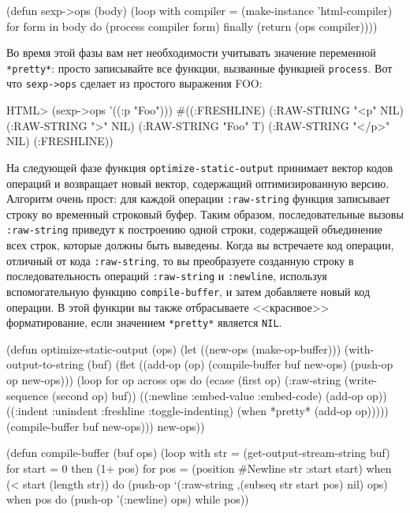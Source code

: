 \begin{myverb}
(defun sexp->ops (body)
  (loop with compiler = (make-instance 'html-compiler)
     for form in body do (process compiler form)
     finally (return (ops compiler))))
\end{myverb}

Во время этой фазы вам нет необходимости учитывать значение переменной \lstinline{*pretty*}:
просто записывайте все функции, вызванные функцией \lstinline{process}.  Вот что
\lstinline{sexp->ops} сделает из простого выражения FOO:

\begin{myverb}
  HTML> (sexp->ops '((:p "Foo")))
  #((:FRESHLINE) (:RAW-STRING "<p" NIL) (:RAW-STRING ">" NIL)
    (:RAW-STRING "Foo" T) (:RAW-STRING "</p>" NIL) (:FRESHLINE))
\end{myverb}

На следующей фазе функция \lstinline{optimize-static-output} принимает вектор кодов операций
и возвращает новый вектор, содержащий оптимизированную версию.  Алгоритм очень прост:
для каждой операции \lstinline{:raw-string} функция записывает строку во временный строковый
буфер. Таким образом, последовательные вызовы \lstinline{:raw-string} приведут к построению
одной строки, содержащей объединение всех строк, которые должны быть выведены. Когда вы
встречаете код операции, отличный от кода \lstinline{:raw-string}, то вы преобразуете созданную
строку в последовательность операций \lstinline{:raw-string} и \lstinline{:newline}, используя
вспомогательную функцию \lstinline{compile-buffer}, и затем добавляете новый код операции.  В
этой функции вы также отбрасываете <<красивое>> форматирование, если значением
\lstinline{*pretty*} является \lstinline{NIL}.

\begin{myverb}
(defun optimize-static-output (ops)
  (let ((new-ops (make-op-buffer)))
    (with-output-to-string (buf)
      (flet ((add-op (op) 
               (compile-buffer buf new-ops)
               (push-op op new-ops)))
        (loop for op across ops do
             (ecase (first op)
               (:raw-string (write-sequence (second op) buf))
               ((:newline :embed-value :embed-code) (add-op op))
               ((:indent :unindent :freshline :toggle-indenting)
                (when *pretty* (add-op op)))))
        (compile-buffer buf new-ops)))
    new-ops))

(defun compile-buffer (buf ops)
  (loop with str = (get-output-stream-string buf)
     for start = 0 then (1+ pos)
     for pos = (position #\bslash{}Newline str :start start)
     when (< start (length str))
     do (push-op `(:raw-string ,(subseq str start pos) nil) ops)
     when pos do (push-op '(:newline) ops)
     while pos))
\end{myverb}

